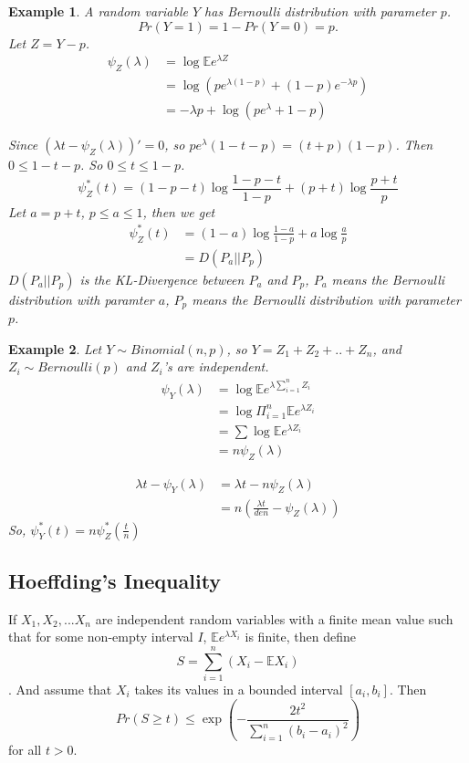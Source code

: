 \documentclass[11pt]{article}
\def\BE{{\mathbb E}}
\newtheorem{example}{Example}[section]
\begin{document}
\begin{example}
A random variable $Y$ has Bernoulli distribution with parameter $p$.\[
Pr(Y = 1) = 1 - Pr(Y = 0) = p.
\]
Let $Z = Y - p$. 
\[\begin{split}
\psi_Z(\lambda) &= \log \BE e^{\lambda Z} \\
&= \log (p e^{\lambda (1-p)} + (1-p) e^{-\lambda p}) \\
&= -\lambda p + \log(p e^\lambda + 1 - p)
\end{split} \]

Since $(\lambda t - \psi_Z(\lambda))' = 0$, so $ pe^\lambda (1-t-p) = (t+p)(1-p)$. Then $ 0 \leq 1 - t - p$. So $ 0 \leq t \leq 1-p$.
\[
\psi^*_Z(t) = (1 - p - t)\log \frac{1-p-t}{1-p} + (p+t)\log\frac{p+t}{p}
\]
Let $a = p+t$, $p \leq a \leq 1$, then we get 
\[\begin{split} \psi_Z^*(t) &= (1 - a)\log\frac{1-a}{1-p} + a \log\frac{a}{p} \\
&= D(P_a || P_p)
 \end{split} \]
 $D(P_a || P_p)$ is the KL-Divergence between $P_a$ and $P_p$, $P_a$ means the Bernoulli distribution with paramter $a$, $P_p$ means the Bernoulli distribution with parameter $p$.
\end{example}

\begin{example}
Let $Y \sim Binomial(n, p)$, so $Y = Z_1 + Z_2 + ..  + Z_n$, and $Z_i \sim Bernoulli(p)$ and $Z_i$'s are independent.
\[\begin{split} 
\psi_Y(\lambda) &= \log \BE e^{\lambda \sum_{i=1}^n Z_i} \\
&= \log \Pi_{i=1}^n \BE e^{\lambda Z_i} \\
&= \sum \log\BE e^{\lambda Z_i} \\
&= n \psi_Z(\lambda)
\end{split}\]

\[\begin{split} \lambda t - \psi_Y(\lambda)  &= \lambda t - n\psi_Z(\lambda) \\
&= n(\frac{\lambda t}{den} - \psi_Z(\lambda)) 
\end{split} \]
So, $\psi_Y^*(t) = n\psi_Z^*(\frac{t}{n})$
\end{example}

\subsection{Hoeffding's Inequality}
If $X_1, X_2, ... X_n$ are independent random variables with a finite mean value such that for some non-empty interval $I$,
$
\BE e^{\lambda X_i} 
$
is finite, then define \[ S = \sum_{i=1}^n (X_i - \BE X_i) \].
And assume that $X_i$ takes its values in a bounded interval $[a_i, b_i]$. Then 
\[
Pr (S \geq t ) \leq \exp( - \frac{2t^2}{\sum_{i=1}^n (b_i - a_i)^2})
\]
for all $t > 0$.
\end{document}
